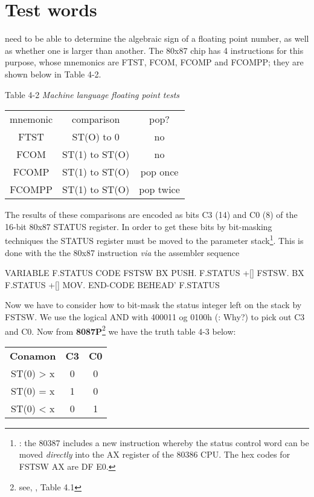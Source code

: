 {{{{\section{Test words}

 need to be able to determine the algebraic sign of a floating point number, as well as whether one is larger than another.
The 80x87 chip has 4 instructions for this purpose, whose mnemonics are FTST, FCOM, FCOMP and FCOMPP; they are shown below in Table 4-2.

Table 4-2 \textit{Machine language floating point tests}
\begin{center}
    \begin{tabular}{|c c c|}
        mnemonic    &   comparison      &   pop?        \\
        FTST        &   ST(O) to 0      &   no          \\
        FCOM        &   ST(1) to ST(O)  &   no          \\
        FCOMP       &   ST(1) to ST(O)  &   pop once    \\
        FCOMPP      &   ST(1) to ST(O)  &   pop twice   \\
    \end{tabular}
\end{center}

The results of these comparisons are encoded as bits C3 (14) and C0 (8) of the 16-bit 80x87 STATUS register. In order to get these bits by bit-masking techniques the STATUS register must be moved to the parameter stack\footnote{\Note: the 80387 includes a new instruction whereby the status control word can be moved \textit{directly} into the AX register of the 80386 CPU. The hex codes for FSTSW AX are DF E0.}. This is done with the the 80x87 instruction  \textit{via} the assembler sequence

\begin{listing}
    VARIABLE F.STATUS
    CODE FSTSW BX PUSH.
        F.STATUS +[] FSTSW.
        BX F.STATUS +[] MOV.
    END-CODE
    BEHEAD' F.STATUS
\end{listing}

Now we have to consider how to bit-mask the status integer left on the stack by FSTSW. We use the logical AND with 400011 og 0100h (: Why?) to pick out C3 and C0. Now from \textbf{8087P}\footnote{see, \eg, Table 4.1} we have the truth table 4-3 below:

\begin{center}
    \begin{tabular}{|c c c|}
        \textbf{Conamon}    &   \textbf{C3} & \textbf{C0}   \\
        ST(0) > x           &   0           & 0             \\
        ST(0) = x           &   1           & 0             \\
        ST(0) < x           &   0           & 1             \\
    \end{tabular}
\end{center}

}}}}
